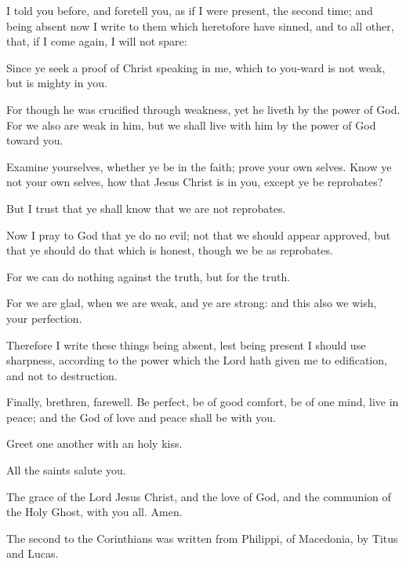 {I told you
before,
and foretell
you, as
if I were
present, the second
time;
and being
absent
now I
write to
them which heretofore have
sinned,
and to
all
other,
that,
if I
come
again, I
will
not
spare:

Since ye
seek a
proof of
Christ
speaking
in
me,
which
to
you-ward
is
not
weak,
but is
mighty
in
you.

For
though he was
crucified
through
weakness,
yet he
liveth
by the
power of
God.
For we
also are
weak
in
him,
but we shall
live
with
him
by the
power of
God
toward
you.

Examine
yourselves,
whether ye
be
in the
faith;
prove your own
selves. Know
ye
not your own
selves, how
that
Jesus
Christ
is
in
you,
except ye
be
reprobates?

But I
trust
that ye shall
know
that
we
are
not
reprobates.

Now I
pray
to
God
that
ye
do
no
evil;
not
that
we should
appear
approved,
but
that
ye should
do that
which is
honest,
though
we
be
as
reprobates.

For we can
do
nothing
against the
truth,
but
for the
truth.

For
we are
glad,
when we are
weak,
and
ye
are
strong:
and
this
also we
wish,
{}
your
perfection.

Therefore I
write these
things
being
absent,
lest being
present I should
use
sharpness,
according to the
power
which the
Lord hath
given
me
to
edification,
and
not
to
destruction.


\par }{\PP {}Finally,
brethren,
farewell. Be
perfect, be of good
comfort,
be of
one
mind, live in
peace;
and the
God of
love
and
peace shall
be
with
you.

Greet one
another
with an
holy
kiss.


\par }{\PP {}All the
saints
salute
you.

The
grace of the
Lord
Jesus
Christ,
and the
love of
God,
and the
communion of the
Holy
Ghost,
{}
with
you
all.
Amen.


\par }{\SH The second
{} to the Corinthians was written from Philippi,
{} of Macedonia, by Titus and Lucas.
\par }
